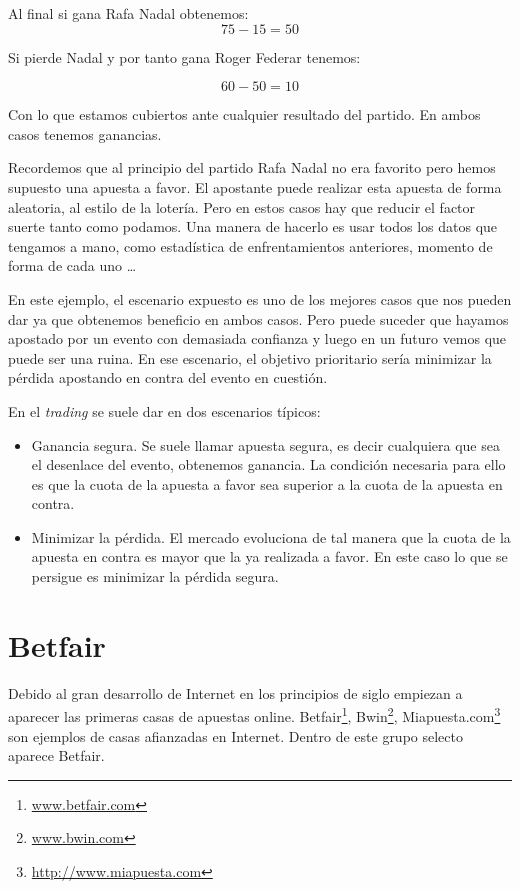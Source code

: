 Al final si gana Rafa Nadal obtenemos: 
   \begin{displaymath}
   75 - 15 = 50 
   \end{displaymath}
   
Si pierde Nadal y por tanto gana Roger Federar tenemos:
   
  \begin{displaymath}
  60 - 50 = 10 
  \end{displaymath}
       
   Con lo que estamos cubiertos ante cualquier resultado del partido. En ambos casos tenemos ganancias. 
   
   Recordemos que al principio del partido Rafa Nadal no era favorito pero hemos supuesto una apuesta a favor. El apostante puede realizar esta apuesta de forma aleatoria, al estilo de la lotería. Pero en estos casos hay que reducir el factor suerte tanto como podamos. Una manera de hacerlo es usar todos los datos que tengamos a mano, como estadística de enfrentamientos anteriores, momento de forma de cada uno \dots   
   
   En este ejemplo, el escenario expuesto es uno de los mejores casos que nos pueden dar ya que obtenemos beneficio en ambos casos. Pero puede suceder que hayamos apostado por un evento con demasiada confianza y luego en un futuro vemos que puede ser una ruina. En ese escenario, el objetivo prioritario sería minimizar la pérdida apostando en contra del evento en cuestión.

En el \emph{trading} se suele dar en dos escenarios típicos:
  
\begin{itemize}
	\item Ganancia segura.
	  Se suele llamar apuesta segura, es decir cualquiera que sea el desenlace del evento, obtenemos ganancia. La condición necesaria para ello es que la cuota de la apuesta a favor sea superior a la cuota de la apuesta en contra. 
	\item Minimizar la pérdida.
	   El mercado evoluciona de tal manera que la cuota de la apuesta en contra es mayor que la ya realizada a favor. En este caso lo que se persigue es minimizar la pérdida segura.
\end{itemize}
   
\section{Betfair}

 Debido al gran desarrollo de Internet en los principios de siglo empiezan a aparecer las primeras casas de apuestas online. Betfair\footnote{\url{www.betfair.com}}, Bwin\footnote{\url{www.bwin.com}}, Miapuesta.com\footnote{\url{http://www.miapuesta.com}} son ejemplos de casas afianzadas en Internet. Dentro de este grupo selecto aparece Betfair.

